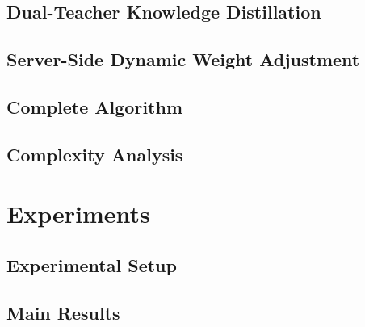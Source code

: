 \documentclass{article}
\begin{document}

\subsection{Dual-Teacher Knowledge Distillation}
\label{sec:dual-teacher}


\subsection{Server-Side Dynamic Weight Adjustment}
\label{sec:weight-adjustment}


\subsection{Complete Algorithm}
\label{sec:algorithm}


\subsection{Complexity Analysis}
\label{sec:complexity}



\section{Experiments}
\label{sec:experiments}

\subsection{Experimental Setup}
\label{sec:setup}


\subsection{Main Results}
\label{sec:main-results}
\end{document}
